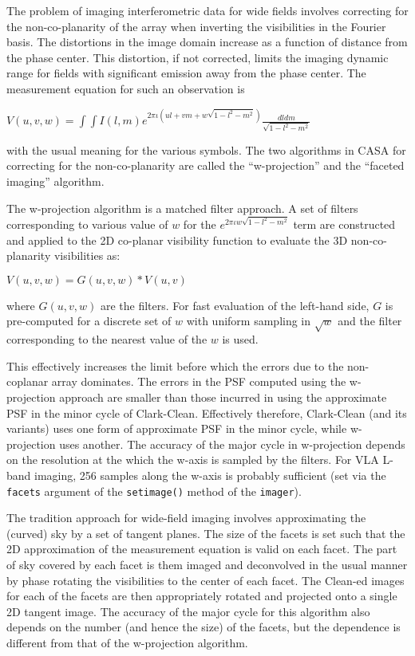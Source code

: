 The problem of imaging interferometric data for wide fields involves
correcting for the non-co-planarity of the array when inverting the
visibilities in the Fourier basis.  The distortions in the image
domain increase as a function of distance from the phase center.  This
distortion, if not corrected, limits the imaging dynamic range for
fields with significant emission away from the phase center.  The
measurement equation for such an observation is

$ V(u,v,w)=\int\int I(l,m) e^{2\pi\iota(u l + v m + w \sqrt{1-l^2-m^2})}
\frac{dl dm}{\sqrt{1-l^2-m^2}} $

with the usual meaning for the various symbols.  The two algorithms
in CASA for correcting for the non-co-planarity are called the
``w-projection'' and the ``faceted imaging'' algorithm.

\vspace{3mm}

The w-projection algorithm is a matched filter approach.  A set of
filters corresponding to various value of $w$ for the $e^{2\pi\iota w
\sqrt{1-l^2-m^2}}$ term are constructed and applied to the 2D
co-planar visibility function to evaluate the 3D non-co-planarity
visibilities as:

$ V(u,v,w)=G(u,v,w)*V(u,v) $

where $G(u,v,w)$ are the filters.  For fast evaluation of the
left-hand side, $G$ is pre-computed for a discrete set of $w$ with
uniform sampling in $\sqrt{w}$ and the filter corresponding to the
nearest value of the $w$ is used.

This effectively increases the limit before which the errors due to
the non-coplanar array dominates.  The errors in the PSF computed
using the w-projection approach are smaller than those incurred in
using the approximate PSF in the minor cycle of Clark-Clean.
Effectively therefore, Clark-Clean (and its variants) uses one form of
approximate PSF in the minor cycle, while w-projection uses another.
The accuracy of the major cycle in w-projection depends on the
resolution at the which the w-axis is sampled by the filters.  For VLA
L-band imaging, 256 samples along the w-axis is probably sufficient
(set via the {\tt facets} argument of the {\tt setimage()} method of
the {\tt imager}).

\vspace{3mm}

The tradition approach for wide-field imaging involves approximating
the (curved) sky by a set of tangent planes. The size of the facets is
set such that the 2D approximation of the measurement equation is
valid on each facet. The part of sky covered by each facet is them
imaged and deconvolved in the usual manner by phase rotating the
visibilities to the center of each facet.  The Clean-ed images for
each of the facets are then appropriately rotated and projected onto a
single 2D tangent image.  The accuracy of the major cycle for this
algorithm also depends on the number (and hence the size) of the
facets, but the dependence is different from that of the w-projection
algorithm.

